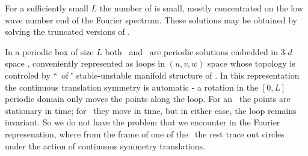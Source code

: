 For a sufficiently small $L$ 
the number of {\eqva} is small,
mostly
concentrated on the low wave number end of the Fourier spectrum.
These solutions may
be obtained by solving the truncated versions of . 








In a periodic box of size $L$
both \eqva\ and \reqva\ are  periodic solutions 
embedded in 3-$d$ space , 
conveniently represented as loops in 
$(u,v,w)$ space whose topology is controled by
``\eqva\ of \eqva\'' stable-unstable manifold structure of
.
In this representation the continuous translation symmetry
is automatic - a rotation in the $[0,L]$ periodic domain only
moves the points along the loop. For an \eqv\ the points
are stationary in time; for \reqv\ they move in time, but in
either case, the loop remains invariant.
So we do not have the problem that we encounter in the Fourier 
represenation, where from the frame of one of the \eqva\
the rest trace out circles under the action of continuous symmetry 
translations.




